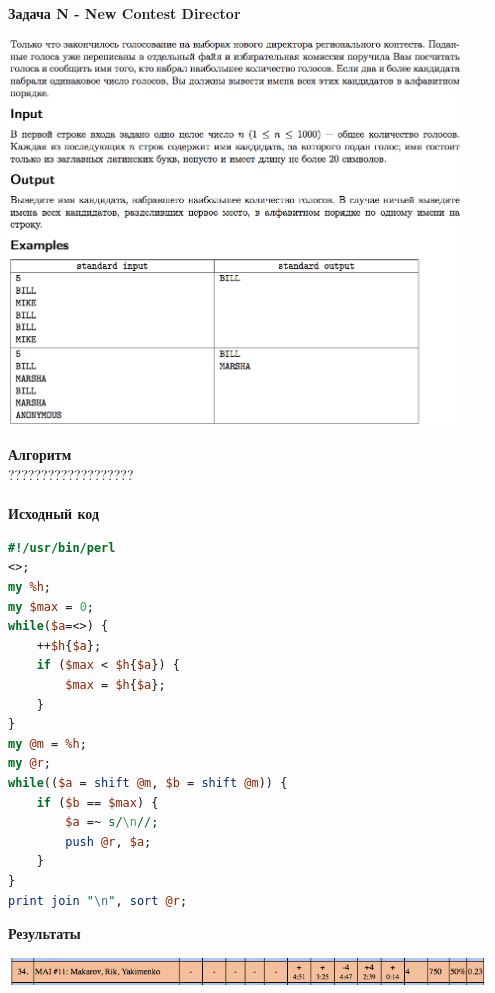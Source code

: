 \documentclass[a4paper,12pt]{article}
\begin{document}
\textbf{{\large Задача N - New Contest Director}} \\
\begin{center}
\includegraphics[width=0.9\textwidth]{OC_America/OC_America_N.png}\\ [1cm]
\end{center}
\newpage

\textbf{{\large Алгоритм}} \\
{\Huge ???????????????????} \\ 
\\
\textbf{{\large Исходный код}}
\begin{lstlisting}[language=Perl]
#!/usr/bin/perl
<>;
my %h;
my $max = 0;
while($a=<>) {
	++$h{$a};
	if ($max < $h{$a}) {
		$max = $h{$a};
	}
}
my @m = %h;
my @r;
while(($a = shift @m, $b = shift @m)) {
	if ($b == $max) {
		$a =~ s/\n//;
		push @r, $a;
	}
}
print join "\n", sort @r;
\end{lstlisting}


\textbf{{\large Результаты}} \\
\begin{center}
\includegraphics[width=0.95\textwidth]{OC_America/OC_America_result.png}\\ [1cm]
\end{center}



%
%
\newpage
\end{document}
